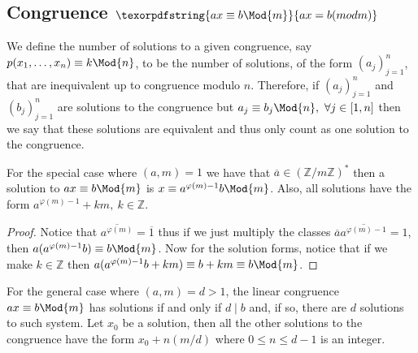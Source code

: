 \subsection{Congruence \(\texorpdfstring{ax \equiv b \Mod{m}}{ax = b (mod m)}\)}

\begin{definition}
   We define the number of solutions to a given congruence, say
   \(p(x_1, \dots, x_n) \equiv k \Mod{n}\), to be the number of solutions, of
   the form \((a_j)_{j=1}^n\), that are inequivalent up to congruence modulo
   \(n\). Therefore, if \((a_j)_{j=1}^n\) and \((b_j)_{j = 1}^{n}\) are
   solutions to the congruence but \(a_j \equiv b_j \Mod{n},\ \forall j \in [1,
   n]\) then we say that these solutions are equivalent and thus only count as
   one solution to the congruence. 
\end{definition}

\begin{proposition}
   For the special case where \((a, m) = 1\) we have that \(\overline{a} \in
   (\mathbb{Z}/m\mathbb{Z})^\ast\) then a solution to \(ax \equiv b \Mod{m}\) is
   \(x \equiv a^{\varphi(m) - 1} b \Mod{m}\). Also, all solutions have the form
   \(a^{\varphi(m)-1} + km,\ k \in \mathbb{Z}\).
\end{proposition}

\begin{proof}
   Notice that \(\overline{a^{\varphi(m)}} = \overline{1}\) thus if we just
   multiply the classes \(\overline{a} \overline{a^{\varphi(m) - 1}} = 1\), then
   \(a (a^{\varphi(m) - 1} b) \equiv b \Mod{m}\). Now for the solution forms,
   notice that if we make \(k \in \mathbb{Z}\) then \(a (a^{\varphi(m) - 1}b +
   km) \equiv b + km \equiv b \Mod{m}\).
\end{proof}

\begin{proposition}
   For the general case where \((a,m) = d > 1\), the linear congruence \(ax
   \equiv b \Mod{m}\) has solutions if and only if \(d \mid b\) and, if so,
   there are \(d\) solutions to such system.  Let \(x_0\) be a solution, then
   all the other solutions to the congruence have the form \(x_0 + n (m/d)\)
   where \(0 \leqslant n \leqslant d-1\) is an integer.
\end{proposition}

